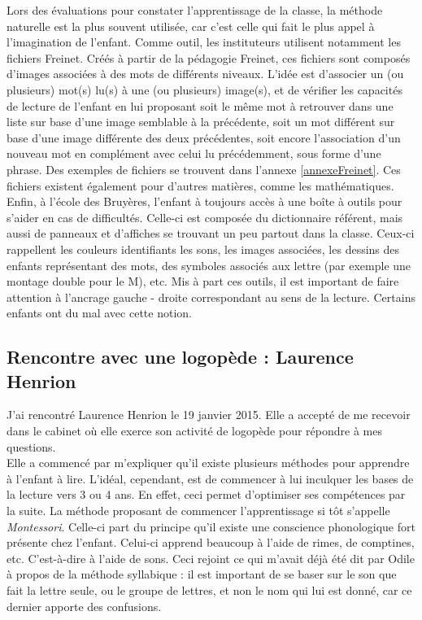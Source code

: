 Lors des évaluations pour constater l'apprentissage de la classe, la méthode naturelle est la plus souvent utilisée, car c'est celle qui fait le plus appel à l'imagination de l'enfant. Comme outil, les instituteurs utilisent notamment les fichiers Freinet. Créés à partir de la pédagogie Freinet, ces fichiers sont composés d'images associées à des mots de différents niveaux. L'idée est d'associer un (ou plusieurs) mot(s) lu(s) à une (ou plusieurs) image(s), et de vérifier les capacités de lecture de l'enfant en lui proposant soit le même mot à retrouver dans une liste sur base d'une image semblable à la précédente, soit un mot différent sur base d'une image différente des deux précédentes, soit encore l'association d'un nouveau mot en complément avec celui lu précédemment, sous forme d'une phrase. Des exemples de fichiers se trouvent dans l'annexe \ref{annexeFreinet}. Ces fichiers existent également pour d'autres matières, comme les mathématiques.\\

Enfin, à l'école des Bruyères, l'enfant à toujours accès à une boîte à outils pour s'aider en cas de difficultés. Celle-ci est composée du dictionnaire référent, mais aussi de panneaux et d'affiches se trouvant un peu partout dans la classe. Ceux-ci rappellent les couleurs identifiants les sons, les images associées, les dessins des enfants représentant des mots, des symboles associés aux lettre (par exemple une montage double pour le M), etc. Mis à part ces outils, il est important de faire attention à l'ancrage gauche - droite correspondant au sens de la lecture. Certains enfants ont du mal avec cette notion.

\subsection{Rencontre avec une logopède : Laurence Henrion}
J'ai rencontré Laurence Henrion le 19 janvier 2015. Elle a accepté de me recevoir dans le cabinet où elle exerce son activité de logopède pour répondre à mes questions.\\

Elle a commencé par m'expliquer qu'il existe plusieurs méthodes pour apprendre à l'enfant à lire. L'idéal, cependant, est de commencer à lui inculquer les bases de la lecture vers 3 ou 4 ans. En effet, ceci permet d'optimiser ses compétences par la suite. La méthode proposant de commencer l'apprentissage si tôt s'appelle \textit{Montessori}. Celle-ci part du principe qu'il existe une conscience phonologique fort présente chez l'enfant. Celui-ci apprend beaucoup à l'aide de rimes, de comptines, etc. C'est-à-dire à l'aide de sons. Ceci rejoint ce qui m'avait déjà été dit par Odile à propos de la méthode syllabique : il est important de se baser sur le son que fait la lettre seule, ou le groupe de lettres, et non le nom qui lui est donné, car ce dernier apporte des confusions.\\

